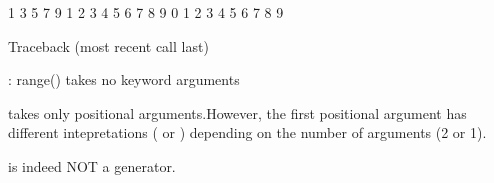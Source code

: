 \documentclass[letterpaper,10pt,english]{sphinxmanual}
\begin{document}
\begin{sphinxVerbatim}[commandchars=\\\{\}]
1 3 5 7 9 
1 2 3 4 5 6 7 8 9 
0 1 2 3 4 5 6 7 8 9 
\end{sphinxVerbatim}

\begin{sphinxVerbatim}[commandchars=\\\{\}]
Traceback (most recent call last)
  
    
        
   

: range() takes no keyword arguments
\end{sphinxVerbatim}

 takes only positional arguments.However, the first positional argument has different intepretations ( or ) depending on the number of arguments (2 or 1).

 is indeed NOT a generator.

\begin{sphinxVerbatim}[commandchars=\\\{\}]
\end{sphinxVerbatim}
\end{document}
